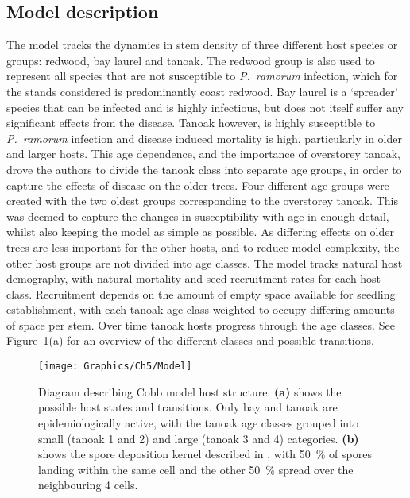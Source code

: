 \subsection{Model description}

The model tracks the dynamics in stem density of three different host species or groups: redwood, bay laurel and tanoak. The redwood group is also used to represent all species that are not susceptible to \textit{P.~ramorum} infection, which for the stands considered is predominantly coast redwood. Bay laurel is a `spreader' species that can be infected and is highly infectious, but does not itself suffer any significant effects from the disease. Tanoak however, is highly susceptible to \textit{P.~ramorum} infection and disease induced mortality is high, particularly in older and larger hosts. This age dependence, and the importance of overstorey tanoak, drove the authors to divide the tanoak class into separate age groups, in order to capture the effects of disease on the older trees. Four different age groups were created with the two oldest groups corresponding to the overstorey tanoak. This was deemed  to capture the changes in susceptibility with age in enough detail, whilst also keeping the model as simple as possible. As differing effects on older trees are less important for the other hosts, and to reduce model complexity, the other host groups are not divided into age classes. The model tracks natural host demography, with natural mortality and seed recruitment rates for each host class. Recruitment depends on the amount of empty space available for seedling establishment, with each tanoak age class weighted to occupy differing amounts of space per stem. Over time tanoak hosts progress through the age classes. See Figure~\ref{fig:ch5:model_description}(a) for an overview of the different classes and possible transitions.

\begin{figure}
\centering
    \texttt{[image: Graphics/Ch5/Model]}
    \caption[Mixed stand model structure]{Diagram describing Cobb model host structure. \textbf{(a)} shows the possible host states and transitions. Only bay and tanoak are epidemiologically active, with the tanoak age classes grouped into small (tanoak 1 and 2) and large (tanoak 3 and 4) categories. \textbf{(b)} shows the spore deposition kernel described in \citet{cobb_ecosystem_2012}, with \SI{50}{\percent} of spores landing within the same cell and the other \SI{50}{\percent} spread over the neighbouring 4 cells.\label{fig:ch5:model_description}}
\end{figure}

